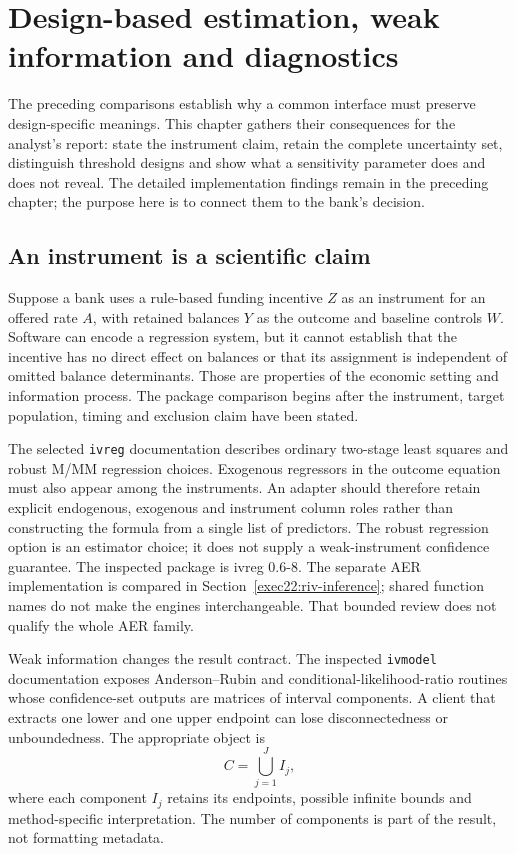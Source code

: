 \chapter{Design-based estimation, weak information and diagnostics}
\label{sw:design}

The preceding comparisons establish why a common interface must preserve
design-specific meanings. This chapter gathers their consequences for the
analyst's report: state the instrument claim, retain the complete uncertainty
set, distinguish threshold designs and show what a sensitivity parameter does
and does not reveal. The detailed implementation findings remain in the
preceding chapter; the purpose here is to connect them to the bank's decision.

\section{An instrument is a scientific claim}

Suppose a bank uses a rule-based funding incentive \(Z\) as an instrument for
an offered rate \(A\), with retained balances \(Y\) as the outcome and baseline
controls \(W\). Software can encode a regression system, but it cannot establish
that the incentive has no direct effect on balances or that its assignment is
independent of omitted balance determinants. Those are properties of the
economic setting and information process. The package comparison begins after
the instrument, target population, timing and exclusion claim have been stated.

The selected \texttt{ivreg} documentation describes ordinary two-stage least
squares and robust M/MM regression choices. Exogenous regressors in the outcome
equation must also appear among the instruments. An adapter should therefore
retain explicit endogenous, exogenous and instrument column roles rather than
constructing the formula from a single list of predictors. The robust regression
option is an estimator choice; it does not supply a weak-instrument confidence
guarantee. The inspected package is ivreg 0.6-8. The separate AER implementation
is compared in Section~\ref{exec22:riv-inference}; shared function names do not
make the engines interchangeable. That bounded review does not qualify the
whole AER family. \citep{v12_sw_ivreg}

Weak information changes the result contract. The inspected \texttt{ivmodel}
documentation exposes Anderson--Rubin and conditional-likelihood-ratio routines
whose confidence-set outputs are matrices of interval components. A client
that extracts one lower and one upper endpoint can lose disconnectedness or
unboundedness. The appropriate object is
\[
 C=\bigcup_{j=1}^{J} I_j,
\]
where each component \(I_j\) retains its endpoints, possible infinite bounds and
method-specific interpretation. The number of components is part of the result,
not formatting metadata. \citep{v12_sw_ivmodel}

